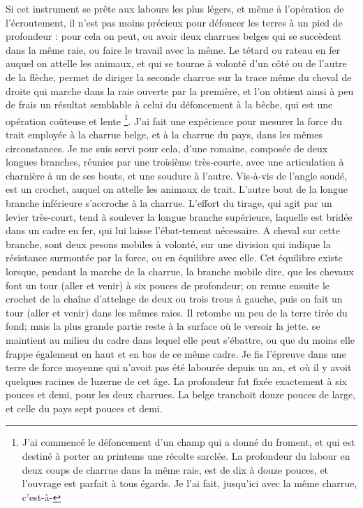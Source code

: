 Si cet instrument se prête aux labours les plus légers, et même à l'opération de l'écroutement, il n'est pas moins précieux pour défoncer les terres à un pied de profondeur : pour cela on peut, ou avoir deux charrues belges qui se succèdent dans la même raie, ou faire le travail avec la même. Le tétard ou rateau en fer auquel on attelle les animaux, et qui se tourne à volonté d'un côté ou de l'autre de la flèche, permet de diriger la seconde charrue sur la trace même du cheval de droite qui marche dans la raie ouverte par la première, et l'on obtient ainsi à peu de frais un résultat semblable à celui du défoncement à la bêche, qui est une opération coûteuse et lente \footnote{J'ai commencé le défoncement d'un champ qui a donné du froment, et qui est destiné à porter au printems une récolte sarclée. La profondeur du labour en deux coups de charrue dans la même raie, est de dix à douze pouces, et l'ouvrage est parfait à tous égards. Je l'ai fait, jusqu'ici avec la même charrue, c'est-à-}.\setcounter{page}{401} J'ai fait une expérience pour mesurer la force du trait employée à la charrue belge, et à la charrue du pays, dans les mêmes circonstances. Je me suis servi pour cela, d'une romaine, composée de deux longues branches, réunies par une troisième très-courte, avec une articulation à charnière à un de ses bouts, et une soudure à l'autre. Vis-à-vis de l'angle soudé, est un crochet, auquel on attelle les animaux de trait. L'autre bout de la longue branche inférieure s'accroche à la charrue. L'effort du tirage, qui agit par un levier très-court, tend à soulever la longue branche supérieure, laquelle est bridée dans un cadre en fer, qui lui laisse l'ébat-tement nécessaire. A cheval sur cette branche, sont deux pesons mobiles à volonté, sur une division qui indique la résistance surmontée par la force, ou en équilibre avec elle. Cet équilibre existe lorsque, pendant la marche de la charrue, la branche mobile
dire, que les chevaux font un tour (aller et venir) à six pouces de profondeur; on remue ensuite le crochet de la chaîne d'attelage de deux ou trois trous à gauche, puis on fait un tour (aller et venir) dans les mêmes raies. Il retombe un peu de la terre tirée du fond; mais la plus grande partie reste à la surface où le versoir la jette.\setcounter{page}{402} se maintient au milieu du cadre dans lequel elle peut s'ébattre, ou que du moins elle frappe également en haut et en bas de ce même cadre.
Je fis l'épreuve dans une terre de force moyenne qui n'avoit pas été labourée depuis un an, et où il y avoit quelques racines de luzerne de cet âge. La profondeur fut fixée exactement à six pouces et demi, pour les deux charrues. La belge tranchoit douze pouces de large, et celle du pays sept pouces et demi.
